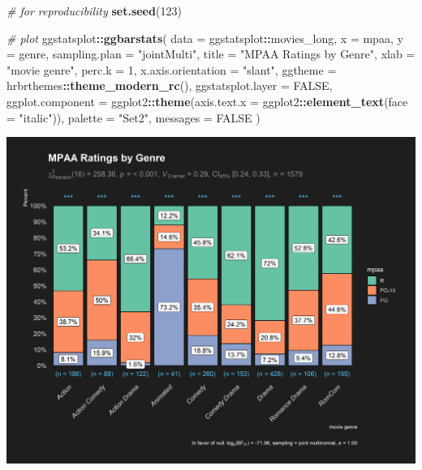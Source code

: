 \documentclass[]{article}
\newenvironment{Shaded}{\begin{snugshade}}{\end{snugshade}}
\newcommand{\CommentTok}[1]{\textcolor[rgb]{0.56,0.35,0.01}{\textit{#1}}}
\newcommand{\DataTypeTok}[1]{\textcolor[rgb]{0.13,0.29,0.53}{#1}}
\newcommand{\DecValTok}[1]{\textcolor[rgb]{0.00,0.00,0.81}{#1}}
\newcommand{\KeywordTok}[1]{\textcolor[rgb]{0.13,0.29,0.53}{\textbf{#1}}}
\newcommand{\NormalTok}[1]{#1}
\newcommand{\OperatorTok}[1]{\textcolor[rgb]{0.81,0.36,0.00}{\textbf{#1}}}
\newcommand{\OtherTok}[1]{\textcolor[rgb]{0.56,0.35,0.01}{#1}}
\newcommand{\StringTok}[1]{\textcolor[rgb]{0.31,0.60,0.02}{#1}}
\begin{document}
\begin{Shaded}
\begin{Highlighting}[]
\CommentTok{# for reproducibility}
\KeywordTok{set.seed}\NormalTok{(}\DecValTok{123}\NormalTok{)}

\CommentTok{# plot}
\NormalTok{ggstatsplot}\OperatorTok{::}\KeywordTok{ggbarstats}\NormalTok{(}
  \DataTypeTok{data =}\NormalTok{ ggstatsplot}\OperatorTok{::}\NormalTok{movies_long,}
  \DataTypeTok{x =}\NormalTok{ mpaa,}
  \DataTypeTok{y =}\NormalTok{ genre,}
  \DataTypeTok{sampling.plan =} \StringTok{"jointMulti"}\NormalTok{,}
  \DataTypeTok{title =} \StringTok{"MPAA Ratings by Genre"}\NormalTok{,}
  \DataTypeTok{xlab =} \StringTok{"movie genre"}\NormalTok{,}
  \DataTypeTok{perc.k =} \DecValTok{1}\NormalTok{,}
  \DataTypeTok{x.axis.orientation =} \StringTok{"slant"}\NormalTok{,}
  \DataTypeTok{ggtheme =}\NormalTok{ hrbrthemes}\OperatorTok{::}\KeywordTok{theme_modern_rc}\NormalTok{(),}
  \DataTypeTok{ggstatsplot.layer =} \OtherTok{FALSE}\NormalTok{,}
  \DataTypeTok{ggplot.component =}\NormalTok{ ggplot2}\OperatorTok{::}\KeywordTok{theme}\NormalTok{(}\DataTypeTok{axis.text.x =}\NormalTok{ ggplot2}\OperatorTok{::}\KeywordTok{element_text}\NormalTok{(}\DataTypeTok{face =} \StringTok{"italic"}\NormalTok{)),}
  \DataTypeTok{palette =} \StringTok{"Set2"}\NormalTok{,}
  \DataTypeTok{messages =} \OtherTok{FALSE}
\NormalTok{)}
\end{Highlighting}
\end{Shaded}

\includegraphics[width=1\linewidth]{./figures/paper-ggbarstats1-1}
\end{document}
